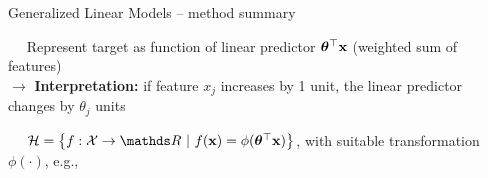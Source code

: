\begin{vbframe}{Generalized Linear Models -- method summary}

   
 
\medskip

 ~~ Represent target as function of linear predictor
$\bm{\theta}^\top \mathbf{x}$ (weighted sum of features)\\
$\rightarrow$ \textbf{Interpretation:} if feature $x_j$ increases by 1 unit, the linear predictor changes by $\theta_j$ units


\medskip

 ~~
$\Hspace = \left\{f: \Xspace \to \R ~|~\fx = \phi(\thetav^\top \xv)\right\}$, 
with suitable transformation $\phi(\cdot)$, e.g.,


\end{vbframe}
